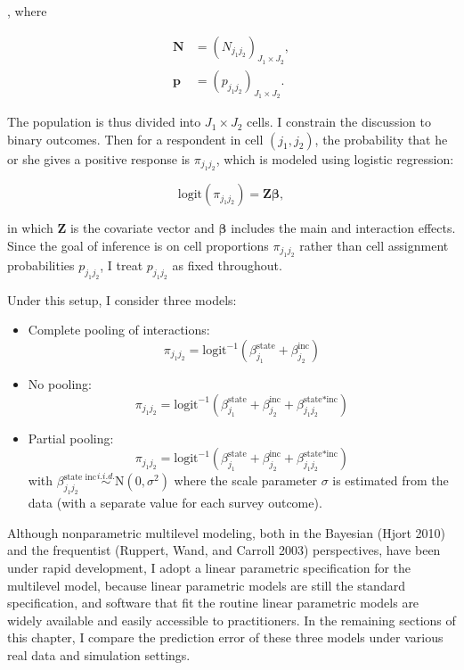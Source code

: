 , where

\begin{align*}
  \bm{N}&=(N_{j_1j_2})_{J_1\times J_2},\\
  \bm{p}&=(p_{j_1j_2})_{J_1\times J_2}.
\end{align*}

\noindent The population is thus divided into \(J_1\times J_2\) cells. I
constrain the discussion to binary outcomes. Then for a respondent in
cell \((j_1, j_2)\), the probability that he or she gives a positive
response is \(\pi_{j_1j_2}\), which is modeled using logistic
regression:

\begin{equation*}
\text{logit}(\pi_{j_1j_2})=\bm Z\bm\beta,
\end{equation*}

\noindent in which \(\bm Z\) is the covariate vector and \(\bm\beta\)
includes the main and interaction effects. Since the goal of inference
is on cell proportions \(\pi_{j_1j_2}\) rather than cell assignment
probabilities \(p_{j_1j_2}\), I treat \(p_{j_1j_2}\) as fixed
throughout.

Under this setup, I consider three models:

\begin{itemize}
\item Complete pooling of interactions:
\begin{equation*}    \pi_{j_1j_2}=\text{logit}^{-1}\left(\beta^{\text{state}}_{j_1}+\beta^{\text{inc}}_{j_2}\right)\end{equation*}
\item
  No pooling:
\begin{equation*}    \pi_{j_1j_2}=\text{logit}^{-1}\left(\beta^{\text{state}}_{j_1}+\beta^{\text{inc}}_{j_2}+\beta^{\text{state*inc}}_{j_1j_2}\right)\end{equation*}

\item
  Partial pooling:
  \begin{equation*}  \pi_{j_1j_2}=\text{logit}^{-1}\left(\beta^{\text{state}}_{j_1}+\beta^{\text{inc}}_{j_2}+\beta^{\text{state*inc}}_{j_1j_2}\right) \end{equation*} with
    $\beta^{\text{state inc}}_{j_1j_2}\stackrel{i.i.d.}{\sim} \mbox{N}(0,\sigma^2)$
   \noindent where the scale parameter $\sigma$ is estimated from the data (with a separate value for each survey outcome).
\end{itemize}

Although nonparametric multilevel modeling, both in the Bayesian (Hjort
2010) and the frequentist (Ruppert, Wand, and Carroll 2003)
perspectives, have been under rapid development, I adopt a linear
parametric specification for the multilevel model, because linear
parametric models are still the standard specification, and software
that fit the routine linear parametric models are widely available and
easily accessible to practitioners. In the remaining sections of this
chapter, I compare the prediction error of these three models under
various real data and simulation settings.

